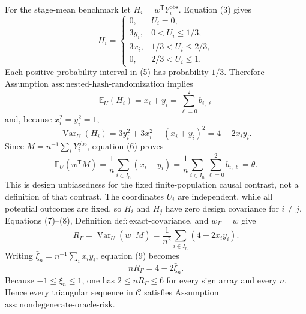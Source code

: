 For the stage-mean benchmark let \(H_i=w^{\mathsf T}Y_i^{\mathrm{obs}}\).  Equation (3) gives
\[
H_i=
\begin{cases}
0,&U_i=0,\\
3y_i,&0<U_i\le1/3,\\
3x_i,&1/3<U_i\le2/3,\\
0,&2/3<U_i\le1.
\end{cases}
\tag{5}
\]
Each positive-probability interval in (5) has probability \(1/3\).  Therefore Assumption \(\mathrm{ass:nested\text{-}hash\text{-}randomization}\) implies
\[
\mathbb E_U(H_i)=x_i+y_i=\sum_{\ell=0}^2b_{i,\ell}
\tag{6}
\]
and, because \(x_i^2=y_i^2=1\),
\[
\operatorname{Var}_U(H_i)
=3y_i^2+3x_i^2-(x_i+y_i)^2
=4-2x_i y_i.
\tag{7}
\]
Since \(M=n^{-1}\sum_iY_i^{\mathrm{obs}}\), equation (6) proves
\[
\mathbb E_U(w^{\mathsf T}M)
=\frac1n\sum_{i\in I_n}(x_i+y_i)
=\frac1n\sum_{i\in I_n}\sum_{\ell=0}^2b_{i,\ell}
=\theta.
\tag{8}
\]
This is design unbiasedness for the fixed finite-population causal contrast, not a definition of that contrast.  The coordinates \(U_i\) are independent, while all potential outcomes are fixed, so \(H_i\) and \(H_j\) have zero design covariance for \(i\ne j\).  Equations (7)--(8), Definition \(\mathrm{def:exact\text{-}covariance}\), and \(w_\Gamma=w\) give
\[
R_\Gamma
=\operatorname{Var}_U(w^{\mathsf T}M)
=\frac1{n^2}\sum_{i\in I_n}(4-2x_i y_i).
\tag{9}
\]
Writing \(\bar\xi_n=n^{-1}\sum_i x_i y_i\), equation (9) becomes
\[
nR_\Gamma=4-2\bar\xi_n.
\tag{10}
\]
Because \(-1\le\bar\xi_n\le1\), one has \(2\le nR_\Gamma\le6\) for every sign array and every \(n\).  Hence every triangular sequence in \(\mathcal C\) satisfies Assumption \(\mathrm{ass:nondegenerate\text{-}oracle\text{-}risk}\).

